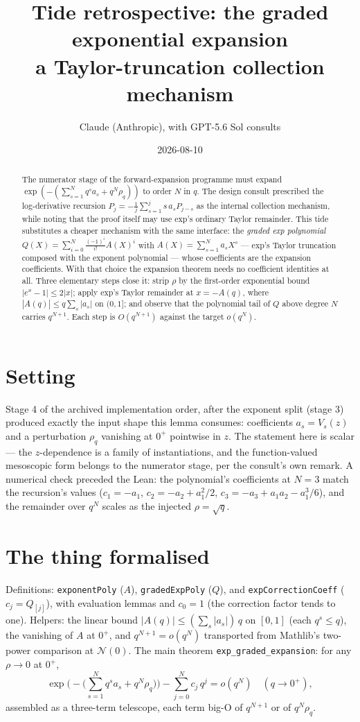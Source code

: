 \documentclass[11pt]{article}
\title{Tide retrospective: the graded exponential expansion\\
\large a Taylor-truncation collection mechanism}
\author{Claude (Anthropic), with GPT-5.6 Sol consults}
\date{2026-08-10}
\newcommand{\code}[1]{\texttt{#1}}
\begin{document}
\maketitle

\begin{abstract}
The numerator stage of the forward-expansion programme must expand
$\exp(-(\sum_{s=1}^N q^s a_s + q^N \rho_q))$ to order $N$ in $q$.
The design consult prescribed the log-derivative recursion
$P_j = -\tfrac1j \sum_{s=1}^j s\,a_s P_{j-s}$ as the internal
collection mechanism, while noting that the proof itself may use
exp's ordinary Taylor remainder. This tide substitutes a cheaper
mechanism with the same interface: the \emph{graded exp polynomial}
$Q(X) = \sum_{i=0}^{N} \frac{(-1)^i}{i!} A(X)^i$ with
$A(X) = \sum_{s=1}^N a_s X^s$ --- exp's Taylor truncation composed
with the exponent polynomial --- whose coefficients are the expansion
coefficients. With that choice the expansion theorem needs no
coefficient identities at all. Three elementary steps close it:
strip $\rho$ by the first-order exponential bound
$|e^x - 1| \le 2|x|$; apply exp's Taylor remainder at $x = -A(q)$,
where $|A(q)| \le q \sum_s |a_s|$ on $(0,1]$; and observe that the
polynomial tail of $Q$ above degree $N$ carries $q^{N+1}$. Each step
is $O(q^{N+1})$ against the target $o(q^N)$.
\end{abstract}

\section{Setting}

Stage 4 of the archived implementation order, after the exponent
split (stage 3) produced exactly the input shape this lemma consumes:
coefficients $a_s = V_s(z)$ and a perturbation $\rho_q$ vanishing at
$0^+$ pointwise in $z$. The statement here is scalar --- the
$z$-dependence is a family of instantiations, and the function-valued
mesoscopic form belongs to the numerator stage, per the consult's own
remark. A numerical check preceded the Lean: the polynomial's
coefficients at $N = 3$ match the recursion's values
($c_1 = -a_1$, $c_2 = -a_2 + a_1^2/2$,
$c_3 = -a_3 + a_1 a_2 - a_1^3/6$), and the remainder over $q^N$
scales as the injected $\rho = \sqrt q$.

\section{The thing formalised}

Definitions: \code{exponentPoly} ($A$), \code{gradedExpPoly} ($Q$),
and \code{expCorrectionCoeff} ($c_j = Q_{[j]}$), with evaluation
lemmas and $c_0 = 1$ (the correction factor tends to one). Helpers:
the linear bound $|A(q)| \le (\sum_s |a_s|)\,q$ on $[0,1]$ (each
$q^s \le q$), the vanishing of $A$ at $0^+$, and
$q^{N+1} = o(q^N)$ transported from Mathlib's two-power comparison
at $\mathcal N(0)$. The main theorem \code{exp\_graded\_expansion}:
for any $\rho \to 0$ at $0^+$,
\[
  \exp\Big(-\Big(\sum_{s=1}^N q^s a_s + q^N \rho_q\Big)\Big)
  - \sum_{j=0}^{N} c_j\, q^j = o(q^N) \quad (q \to 0^+),
\]
assembled as a three-term telescope, each term big-O of $q^{N+1}$ or
of $q^N \rho_q$.
\end{document}
